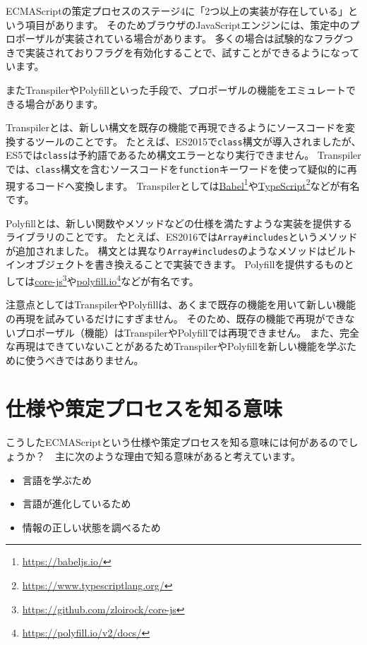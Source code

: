 ECMAScriptの策定プロセスのステージ4に「2つ以上の実装が存在している」という項目があります。
そのためブラウザのJavaScriptエンジンには、策定中のプロポーザルが実装されている場合があります。
多くの場合は試験的なフラグつきで実装されておりフラグを有効化することで、試すことができるようになっています。

またTranspilerやPolyfillといった手段で、プロポーザルの機能をエミュレートできる場合があります。

Transpilerとは、新しい構文を既存の機能で再現できるようにソースコードを変換するツールのことです。
たとえば、ES2015で\texttt{class}構文が導入されましたが、ES5では\texttt{class}は予約語であるため構文エラーとなり実行できません。
Transpilerでは、\texttt{class}構文を含むソースコードを\texttt{function}キーワードを使って疑似的に再現するコードへ変換します。
Transpilerとしては\href{https://babeljs.io/}{Babel}\footnote{\url{https://babeljs.io/}}や\href{https://www.typescriptlang.org/}{TypeScript}\footnote{\url{https://www.typescriptlang.org/}}などが有名です。

Polyfillとは、新しい関数やメソッドなどの仕様を満たすような実装を提供するライブラリのことです。
たとえば、ES2016では\texttt{Array\#includes}というメソッドが追加されました。
構文とは異なり\texttt{Array\#includes}のようなメソッドはビルトインオブジェクトを書き換えることで実装できます。
Polyfillを提供するものとしては\href{https://github.com/zloirock/core-js}{core-js}\footnote{\url{https://github.com/zloirock/core-js}}や\href{https://polyfill.io/v2/docs/}{polyfill.io}\footnote{\url{https://polyfill.io/v2/docs/}}などが有名です。

注意点としてはTranspilerやPolyfillは、あくまで既存の機能を用いて新しい機能の再現を試みているだけにすぎません。
そのため、既存の機能で再現ができないプロポーザル（機能）はTranspilerやPolyfillでは再現できません。
また、完全な再現はできていないことがあるためTranspilerやPolyfillを新しい機能を学ぶために使うべきではありません。

\hypertarget{meaning-specification-process}{%
\section{仕様や策定プロセスを知る意味}\label{meaning-specification-process}}

こうしたECMAScriptという仕様や策定プロセスを知る意味には何があるのでしょうか？　主に次のような理由で知る意味があると考えています。

\begin{itemize}
\item
  言語を学ぶため
\item
  言語が進化しているため
\item
  情報の正しい状態を調べるため
\end{itemize}


